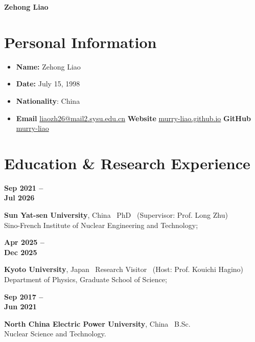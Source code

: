 \documentclass[10pt]{article}
\newlength{\datecol}
\newcommand{\cvrow}[2]{%
  \noindent\begin{minipage}[t]{\datecol}\color{accent}\bfseries\small #1\end{minipage}%
  \begin{minipage}[t]{\dimexpr\linewidth-\datecol\relax}#2\end{minipage}\par\vspace{7pt}%
}
\begin{document}
{\Huge\bfseries Zehong Liao}\\[0.3em]

\vspace{0.1em}
\section*{Personal Information}
\begin{itemize}[leftmargin=1.2em,itemsep=4pt,topsep=2pt,label={\color{accent}$\blacktriangleright$}]

\item \textbf{Name:} Zehong Liao

\item \textbf{Date:} July 15, 1998

\item \textbf{Nationality}: China

\item \textbf{Email} \href{mailto:liaozh26@mail2.sysu.edu.cn}{liaozh26@mail2.sysu.edu.cn}
\quad\textbf{Website} \href{https://murry-liao.github.io}{murry-liao.github.io}
\quad\textbf{GitHub} \href{https://github.com/murry-liao}{murry-liao}
\end{itemize}



\section*{Education \& Research Experience}

\cvrow{Sep 2021 -- \\ Jul 2026}{%
  \textbf{Sun Yat-sen University}, China \textperiodcentered\ PhD \textperiodcentered\ (Supervisor: Prof. Long Zhu)\\
  Sino-French Institute of Nuclear Engineering and Technology; 
}
\cvrow{Apr 2025 -- \\ Dec 2025}{%
  \textbf{Kyoto University}, Japan \textperiodcentered\ Research Visitor
  \textperiodcentered\ (Host: Prof. Kouichi Hagino)\\
  Department of Physics, Graduate School of Science;  
}
\cvrow{Sep 2017 -- \\ Jun 2021}{%
  \textbf{North China Electric Power University}, China \textperiodcentered\ B.Sc.\\
  Nuclear Science and Technology.%
}
\end{document}
